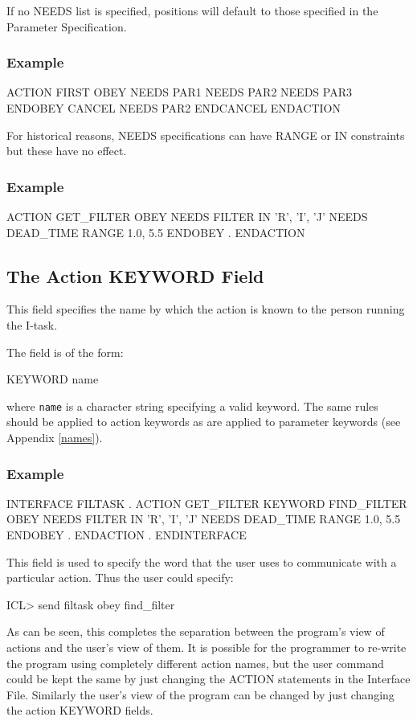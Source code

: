 \documentclass[twoside,11pt,nolof]{starlink}
\begin{document}
If no NEEDS list is specified, positions will default to those specified
in the Parameter Specification.

\subsubsection*{Example}
\begin{terminalv}
ACTION FIRST
   OBEY
      NEEDS PAR1
      NEEDS PAR2
      NEEDS PAR3
   ENDOBEY
   CANCEL
      NEEDS PAR2
   ENDCANCEL
ENDACTION
\end{terminalv}
For historical reasons, NEEDS specifications can have RANGE or IN constraints
but these have no effect.

\subsubsection*{Example}
\begin{terminalv}
ACTION GET_FILTER
   OBEY
      NEEDS FILTER IN 'R', 'I', 'J'
      NEEDS DEAD_TIME RANGE 1.0, 5.5
   ENDOBEY
      .
ENDACTION
\end{terminalv}

\subsection{The Action KEYWORD Field}

This field specifies the name by which the action is known to
the person running the I-task.

The field is of the form:
\begin{terminalv}
KEYWORD  name
\end{terminalv}
where \texttt{name} is a character string specifying a valid keyword.
The same rules should be applied to action keywords as are applied to parameter
keywords (see Appendix \ref{names}).

\subsubsection*{Example}
\begin{terminalv}
INTERFACE FILTASK
      .
   ACTION GET_FILTER
      KEYWORD FIND_FILTER
      OBEY
         NEEDS FILTER IN 'R', 'I', 'J'
         NEEDS DEAD_TIME RANGE 1.0, 5.5
      ENDOBEY
         .
   ENDACTION
      .
ENDINTERFACE
\end{terminalv}
This field is used to specify the word that the user uses to communicate
with a particular action. Thus the user could specify:
\begin{terminalv}
ICL> send filtask obey find_filter
\end{terminalv}
As can be seen, this completes the separation between the program's
view of actions and the user's view of them. It is possible for the
programmer to re-write the program using completely different action
names, but the user command could be kept the same by just changing the
ACTION statements in the Interface File. Similarly the
user's view of the program can be changed by just changing the
action KEYWORD fields.
\end{document}
